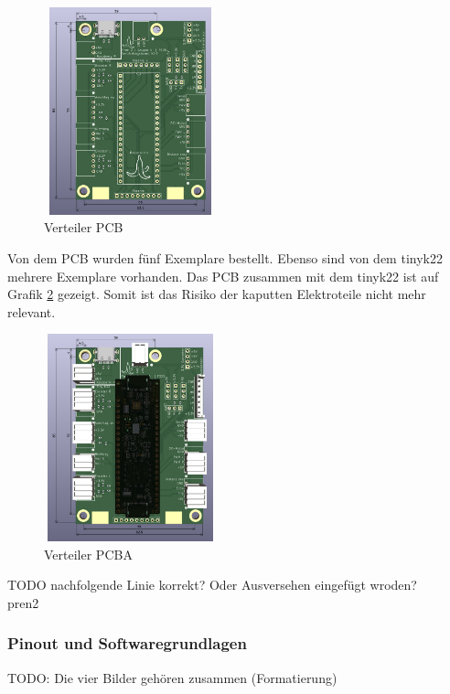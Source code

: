 \begin{figure}[H]
\centering
\includegraphics[width=5cm, height=6cm]{assets/ET/PCB/VerteilerPCB_unbestueckt.png}
\caption{Verteiler PCB}
\label{fig: Verteiler PCB}
\end{figure}

Von dem PCB wurden fünf Exemplare bestellt. Ebenso sind von dem \gls{tinyk22} mehrere Exemplare vorhanden. Das PCB zusammen mit dem \gls{tinyk22} ist auf Grafik \ref{fig: Verteiler PCBA} gezeigt. Somit ist das Risiko der kaputten Elektroteile nicht mehr relevant.

\begin{figure}[H]
\centering
\includegraphics[width=5cm, height=6cm]{assets/ET/PCB/VerteilerPCB_bestueckt.png}
\caption{Verteiler PCBA}
\label{fig: Verteiler PCBA}
\end{figure}

TODO nachfolgende Linie korrekt? Oder Ausversehen eingefügt wroden?\\
\gls{pren2}



\subsubsection{Pinout und Softwaregrundlagen}

TODO: Die vier Bilder gehören zusammen (Formatierung)

